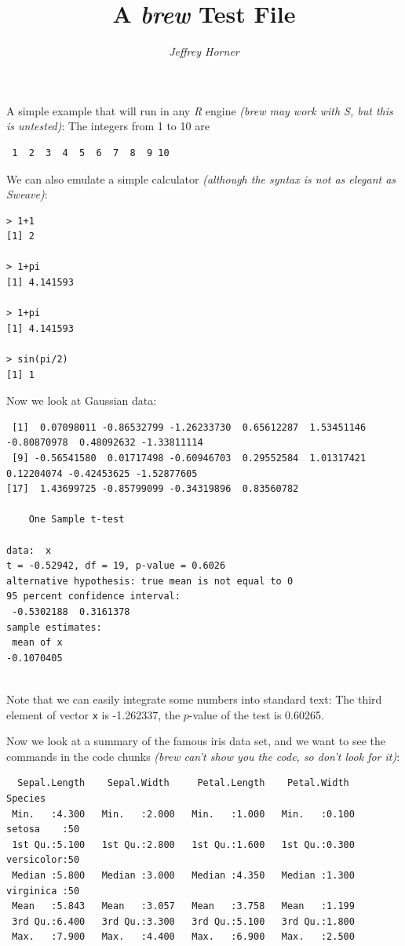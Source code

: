 \documentclass[a4paper]{article}
\title{A \emph{brew} Test File}
\author{\emph{Jeffrey Horner}}
\begin{document}
\maketitle

A simple example that will run in any \emph{R} engine \emph{(brew may work with S, but this is untested)}: The integers from 1 to
10 are
\begin{verbatim}
 1  2  3  4  5  6  7  8  9 10
\end{verbatim}

We can also emulate a simple calculator \emph{(although the syntax is not as elegant as Sweave)}:
\begin{verbatim}
> 1+1
[1] 2

> 1+pi
[1] 4.141593

> 1+pi
[1] 4.141593

> sin(pi/2)
[1] 1

\end{verbatim}

Now we look at Gaussian data:

\begin{verbatim}
 [1]  0.07098011 -0.86532799 -1.26233730  0.65612287  1.53451146 -0.80870978  0.48092632 -1.33811114
 [9] -0.56541580  0.01717498 -0.60946703  0.29552584  1.01317421  0.12204074 -0.42453625 -1.52877605
[17]  1.43699725 -0.85799099 -0.34319896  0.83560782

	One Sample t-test

data:  x
t = -0.52942, df = 19, p-value = 0.6026
alternative hypothesis: true mean is not equal to 0
95 percent confidence interval:
 -0.5302188  0.3161378
sample estimates:
 mean of x 
-0.1070405 


\end{verbatim}

Note that we can easily integrate some numbers into standard text: The
third element of vector \texttt{x} is -1.262337, the
$p$-value of the test is 0.60265. %

Now we look at a summary of the famous iris data set, and we want to
see the commands in the code chunks \emph{(brew can't show you the code, so
don't look for it)}:

\begin{verbatim}
  Sepal.Length    Sepal.Width     Petal.Length    Petal.Width          Species  
 Min.   :4.300   Min.   :2.000   Min.   :1.000   Min.   :0.100   setosa    :50  
 1st Qu.:5.100   1st Qu.:2.800   1st Qu.:1.600   1st Qu.:0.300   versicolor:50  
 Median :5.800   Median :3.000   Median :4.350   Median :1.300   virginica :50  
 Mean   :5.843   Mean   :3.057   Mean   :3.758   Mean   :1.199                  
 3rd Qu.:6.400   3rd Qu.:3.300   3rd Qu.:5.100   3rd Qu.:1.800                  
 Max.   :7.900   Max.   :4.400   Max.   :6.900   Max.   :2.500                  

\end{verbatim}
\end{document}
